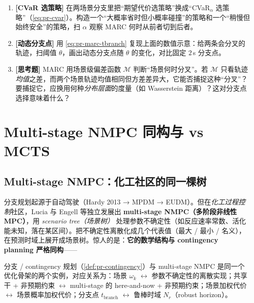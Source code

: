 \begin{practice}
\begin{enumerate}
  \item \textbf{[CVaR 选策略]} 在两场景分支里把“期望代价选策略”换成“CVaR$_\alpha$ 选策略”（\cref{eq:pr-cvar}）。构造一个“大概率省时但小概率碰撞”的策略和一个“稍慢但始终安全”的策略，扫 $\alpha$ 观察 MARC 何时从前者切到后者。
  \item \textbf{[动态分支点]} 用 \cref{eq:pr-marc-tbranch} 复现上面的数值示意：给两条会分叉的轨迹，扫阈值 $\theta$，画出动态分支点随 $\theta$ 的变化，对比固定 $2\,$s 分支点。
  \item \textbf{[思考题]} MARC 用场景级偏差函数 $\mathcal{M}$ 判断“场景何时分叉”。若 $\mathcal{M}$ 只看轨迹\emph{均值}之差，而两个场景轨迹均值相同但方差差异大，它能否捕捉这种“分叉”？要捕捉它，应换用何种\emph{分布层面}的度量（如 Wasserstein 距离）？这对分支点选择意味着什么？
\end{enumerate}
\end{practice}

\section{Multi-stage NMPC 同构与 vs MCTS}
\label{sec:pr-msnmpc}

\subsection{Multi-stage NMPC：化工社区的同一棵树}
\label{sec:pr-msnmpc-iso}

分支规划起源于自动驾驶（Hardy 2013 → MPDM → EUDM）。但在\emph{化工过程控制}社区，Lucia 与 Engell 等独立发展出 \textbf{multi-stage NMPC（多阶段非线性 MPC）}\cite{lucia2013multistage}，用 \emph{scenario tree（场景树）} 处理参数不确定性（如反应速率常数、活化能未知，落在某区间）。把不确定性离散化成几个代表值（最大 / 最小 / 名义），在预测时域上展开成场景树。惊人的是：\textbf{它的数学结构与 contingency planning 严格同构}——

\begin{theorem}\label{thm:pr-isomorphism}
分支 / contingency 规划（\cref{def:pr-contingency}）与 multi-stage NMPC 是同一个优化骨架的两个实例，对应关系为：场景 $\omega_k$ $\leftrightarrow$ 参数不确定性的离散实现；共享干 + 非预期约束 $\leftrightarrow$ multi-stage 的 here-and-now + 非预期约束；场景加权代价 $\leftrightarrow$ 场景概率加权代价；分支点 $t_{\mathrm{branch}}$ $\leftrightarrow$ 鲁棒时域 $N_r$（robust horizon）。
\end{theorem}

